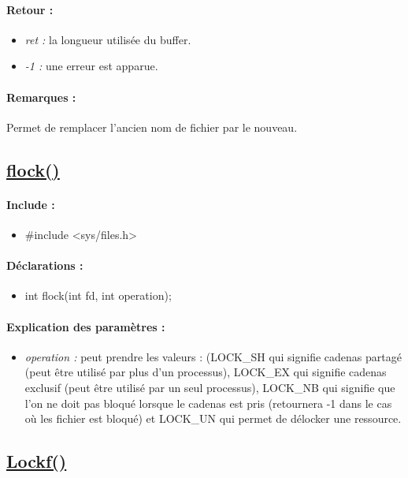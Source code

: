\documentclass{article}[12pt]
\begin{document}
\paragraph{Retour : }
\begin{itemize}
	\item \emph{ret : } la longueur utilisée du buffer. 
	\item \emph{-1 : } une erreur est apparue.
\end{itemize}
\paragraph{Remarques : }
Permet de remplacer l'ancien nom de fichier par le nouveau.
\subsection{\href{http://jp.barralis.com/linux-man/man2/flock.2.php}{flock()}}
\paragraph{Include : }
\begin{itemize}
	\item \#include <sys/files.h>
\end{itemize}
\paragraph{Déclarations : }
\begin{itemize}
	\item int flock(int fd, int operation);
\end{itemize}
\paragraph{Explication des paramètres : }
\begin{itemize}
	\item \emph{operation : } peut prendre les valeurs : (LOCK\_SH qui signifie cadenas partagé (peut être utilisé par plus d'un processus), LOCK\_EX qui signifie cadenas exclusif (peut être utilisé par un seul processus), LOCK\_NB qui signifie que l'on ne doit pas bloqué lorsque le cadenas est pris (retournera -1 dans le cas où les fichier est bloqué) et LOCK\_UN qui permet de délocker une ressource. 
\end{itemize}
\subsection{\href{http://jp.barralis.com/linux-man/man3/lockf.3.php}{Lockf()}}
\end{document}
